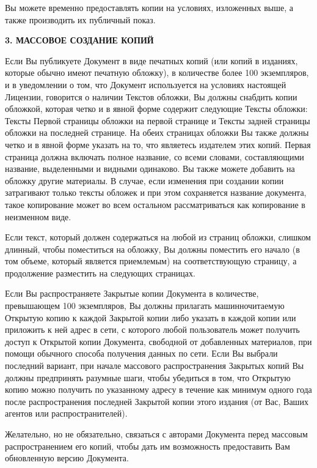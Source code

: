 Вы можете временно предоставлять копии на условиях, изложенных выше, а
также производить их публичный показ.

\begin{center}
{\Large\bf 3. МАССОВОЕ СОЗДАНИЕ КОПИЙ\par}
\end{center}

Если Вы публикуете Документ в виде печатных копий (или копий в
изданиях, которые обычно имеют печатную обложку), в количестве более
100 экземпляров, и в уведомлении о том, что Документ используется на
условиях настоящей Лицензии, говорится о наличии Текстов обложки, Вы
должны снабдить копии обложкой, которая четко и в явной форме содержит
следующие Тексты обложки: Тексты Первой страницы обложки на первой
странице и Тексты задней страницы обложки на последней странице. На
обеих страницах обложки Вы также должны четко и в явной форме указать
на то, что являетесь издателем этих копий. Первая страница должна
включать полное название, со всеми словами, составляющими название,
выделенными и видными одинаково. Вы также можете добавить на обложку
другие материалы. В случае, если изменения при создании копии
затрагивают только тексты обложек и при этом сохраняется название
документа, такое копирование может во всем остальном рассматриваться
как копирование в неизменном виде.

Если текст, который должен содержаться на любой из страниц обложки,
слишком длинный, чтобы поместиться на обложку, Вы должны поместить его
начало (в том объеме, который является приемлемым) на соответствующую
страницу, а продолжение разместить на следующих страницах.

Если Вы распространяете Закрытые копии Документа в количестве,
превышающем 100 экземпляров, Вы должны прилагать машинночитаемую
Открытую копию к каждой Закрытой копии либо указать в каждой копии или
приложить к ней адрес в сети, с которого любой пользователь может
получить доступ к Открытой копии Документа, свободной от добавленных
материалов, при помощи обычного способа получения данных по сети. Если
Вы выбрали последний вариант, при начале массового распространения
Закрытых копий Вы должны предпринять разумные шаги, чтобы убедиться в
том, что Открытую копию можно получить по указанному адресу в течение
как минимум одного года после распространения последней Закрытой копии
этого издания (от Вас, Ваших агентов или распространителей).

Желательно, но не обязательно, связаться с авторами Документа перед
массовым распространением его копий, чтобы дать им возможность
предоставить Вам обновленную версию Документа.

